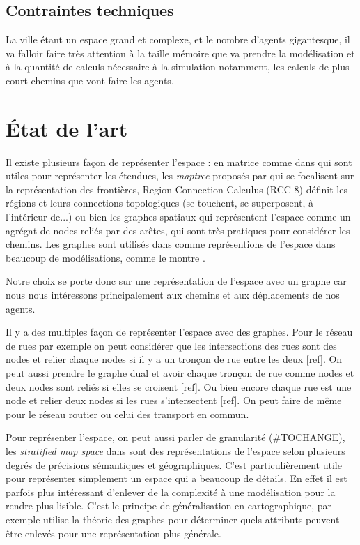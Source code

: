\documentclass[a4paper]{article}
\begin{document}
\subsection{Contraintes techniques}

La ville étant un espace grand et complexe, et le nombre d'agents gigantesque,
il va falloir faire très attention à la taille mémoire que va prendre la
modélisation et à la quantité de calculs nécessaire à la simulation notamment,
les calculs de plus court chemins que vont faire les agents.

\section{État de l'art}

Il existe plusieurs façon de représenter l'espace : en matrice comme dans
\cite{batty1999} qui sont utiles pour représenter les étendues, les
\emph{maptree} proposés par \cite{worboys2012} qui se focalisent sur la
représentation des frontières, Region Connection Calculus (RCC-8)
\cite{randell1992} définit les régions et leurs connections topologiques (se
touchent, se superposent, à l'intérieur de...) ou bien les graphes spatiaux qui
représentent l'espace comme un agrégat de nodes reliés par des arêtes, qui sont
très pratiques pour considérer les chemins. Les graphes sont utilisés dans comme
représentions de l'espace dans beaucoup de modélisations, comme le montre
\cite{dale2010}.

Notre choix se porte donc sur une représentation de l'espace avec un graphe car
nous nous intéressons principalement aux chemins et aux déplacements de nos
agents.

Il y a des multiples façon de représenter l'espace avec des graphes. Pour le
réseau de rues par exemple on peut considérer que les intersections des rues
sont des nodes et relier chaque nodes si il y a un tronçon de rue entre les deux
[ref]. On peut aussi prendre le graphe dual et avoir chaque tronçon de rue comme
nodes et deux nodes sont reliés si elles se croisent [ref]. Ou bien encore
chaque rue est une node et relier deux nodes si les rues s'intersectent [ref].
On peut faire de même pour le réseau routier ou celui des transport en commun.

Pour représenter l'espace, on peut aussi parler de granularité (#TOCHANGE), les
\emph{stratified map space} dans \cite{stell1998} sont des représentations de
l'espace selon plusieurs degrés de précisions sémantiques et géographiques.
C'est particulièrement utile pour représenter simplement un espace qui a
beaucoup de détails. En effet il est parfois plus intéressant d'enlever de la
complexité à une modélisation pour la rendre plus lisible. C'est le principe de
généralisation en cartographique, par exemple \cite{mackaness1993} utilise la
théorie des graphes pour déterminer quels attributs peuvent être enlevés pour
une représentation plus générale.
\end{document}
